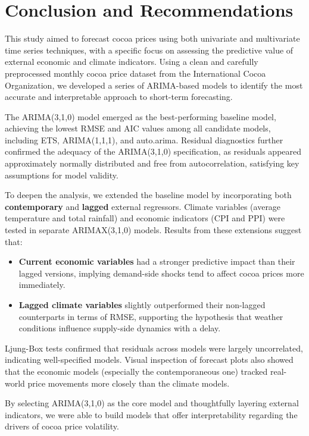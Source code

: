 \chapter{Conclusion and Recommendations}
This study aimed to forecast cocoa prices using both univariate and multivariate time series techniques, with a specific focus on assessing the predictive value of external economic and climate indicators. Using a clean and carefully preprocessed monthly cocoa price dataset from the International Cocoa Organization, we developed a series of ARIMA-based models to identify the most accurate and interpretable approach to short-term forecasting.

The ARIMA(3,1,0) model emerged as the best-performing baseline model, achieving the lowest RMSE and AIC values among all candidate models, including ETS, ARIMA(1,1,1), and auto.arima. Residual diagnostics further confirmed the adequacy of the ARIMA(3,1,0) specification, as residuals appeared approximately normally distributed and free from autocorrelation, satisfying key assumptions for model validity.

To deepen the analysis, we extended the baseline model by incorporating both \textbf{contemporary} and \textbf{lagged} external regressors. Climate variables (average temperature and total rainfall) and economic indicators (CPI and PPI) were tested in separate ARIMAX(3,1,0) models. Results from these extensions suggest that:

\begin{itemize}
    \item \textbf{Current economic variables} had a stronger predictive impact than their lagged versions, implying demand-side shocks tend to affect cocoa prices more immediately.
    \item \textbf{Lagged climate variables} slightly outperformed their non-lagged counterparts in terms of RMSE, supporting the hypothesis that weather conditions influence supply-side dynamics with a delay.
\end{itemize}
Ljung-Box tests confirmed that residuals across models were largely uncorrelated, indicating well-specified models. Visual inspection of forecast plots also showed that the economic models (especially the contemporaneous one) tracked real-world price movements more closely than the climate models.

By selecting ARIMA(3,1,0) as the core model and thoughtfully layering external indicators, we were able to build models that offer interpretability regarding the drivers of cocoa price volatility. 


